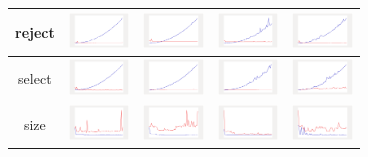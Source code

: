 \begin{longtable}{ c|c c c c}
reject
&
\includegraphics[width=1.6cm]{../graphs/sequence/small/Reject}
&
\includegraphics[width=1.6cm]{../graphs/set/small/Reject}
&
\includegraphics[width=1.6cm]{../graphs/bag/small/Reject}
&
\includegraphics[width=1.6cm]{../graphs/orderedset/small/Reject}
\\\hline

select
&
\includegraphics[width=1.6cm]{../graphs/sequence/small/Select}
&
\includegraphics[width=1.6cm]{../graphs/set/small/Select}
&
\includegraphics[width=1.6cm]{../graphs/bag/small/Select}
&
\includegraphics[width=1.6cm]{../graphs/orderedset/small/Select}
\\\hline

size
&
\includegraphics[width=1.6cm]{../graphs/sequence/small/Size}
&
\includegraphics[width=1.6cm]{../graphs/set/small/Size}
&
\includegraphics[width=1.6cm]{../graphs/bag/small/Size}
&
\includegraphics[width=1.6cm]{../graphs/orderedset/small/Size}
\\\hline


\end{longtable}
